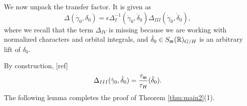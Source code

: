 \documentclass{article}
\theoremstyle{definition}
\numberwithin{equation}{section}
\renewcommand{\-}{\hyp{}}
\newcommand{\warn}[1]{{\leavevmode\color{red}[#1]}}
\begin{document}
We now unpack the transfer factor. It is given as
\[ \Delta(\dot\gamma_0,\delta_0) = \epsilon\Delta_I^{-1}(\dot\gamma_0,\dot\delta_0)\Delta_{III}(\dot\gamma_0,\dot\delta_0), \]
where we recall that the term $\Delta_{IV}$ is missing because we are working with normalized characters and orbital integrals, and $\dot\delta_0 \in S_{\mathfrak{w}}(\mathbb{R})_{G/H}$ is an arbitrary lift of $\delta_0$.

By construction, \warn{ref}
\[ \Delta_{III}(\dot\gamma_0,\dot\delta_0) = \frac{\tau_{\mathfrak{w}}}{\tau_H}(\dot\delta_0). \]
The following lemma completes the proof of Theorem \ref{thm:main2}(1).
\end{document}
